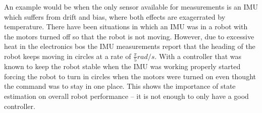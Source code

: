 An example would be when the only sensor available for measurements is an IMU which suffers from drift and bias, where both effects are exagerrated by temperature. There have been situations in which an IMU was in a robot with the motors turned off so that the robot is not moving. However, due to excessive heat in the electronics bos the IMU measurements report that the heading of the robot keeps moving in circles at a rate of $\frac{\pi}{5} rad/s$. With a controller that was known to keep the robot stable when the IMU was working properly started forcing the robot to turn in circles when the motors were turned on even thought the command was to stay in one place. This shows the importance of state estimation on overall robot performance -- it is not enough to only have a good controller.